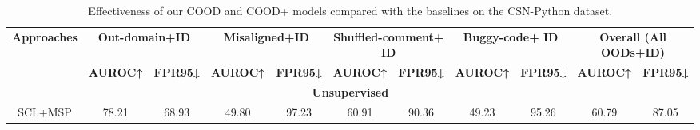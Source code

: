 
\begin{table*}[thb]
\centering
\footnotesize
\caption{Effectiveness of our COOD and COOD+ models compared with the baselines on the CSN-Python dataset.}
\label{tab:results-python}
\begin{adjustbox}{width=0.9\textwidth}\small
\begin{tabular}{|ccccccccccc|}
\hline
\multicolumn{1}{|c|}{\multirow{2}{*}{\textbf{Approaches}}} & \multicolumn{2}{c|}{\textbf{Out-domain+ID}}                                 & \multicolumn{2}{c|}{\textbf{Misaligned+ID}}                                 & \multicolumn{2}{c|}{\textbf{Shuffled-comment+ ID}}                          & \multicolumn{2}{c|}{\textbf{Buggy-code+ ID}}                                & \multicolumn{2}{c|}{\textbf{Overall (All OODs+ID)}}    \\ \cline{2-11} 
\multicolumn{1}{|c|}{}                            & \multicolumn{1}{c|}{\textbf{AUROC↑}} & \multicolumn{1}{c|}{\textbf{FPR95↓}} & \multicolumn{1}{c|}{\textbf{AUROC↑}} & \multicolumn{1}{c|}{\textbf{FPR95↓}} & \multicolumn{1}{c|}{\textbf{AUROC↑}} & \multicolumn{1}{c|}{\textbf{FPR95↓}} & \multicolumn{1}{c|}{\textbf{AUROC↑}} & \multicolumn{1}{c|}{\textbf{FPR95↓}} & \multicolumn{1}{c|}{\textbf{AUROC↑}} & \textbf{FPR95↓} \\ \hline
\multicolumn{11}{|c|}{\textbf{Unsupervised}}                                                                                                                                                                                                                                                                                                                                                                                \\ \hline
\multicolumn{1}{|c|}{SCL+MSP}              & \multicolumn{1}{c|}{78.21}           & \multicolumn{1}{c|}{68.93}           & \multicolumn{1}{c|}{49.80}           & \multicolumn{1}{c|}{97.23}           & \multicolumn{1}{c|}{60.91}           & \multicolumn{1}{c|}{90.36}           & \multicolumn{1}{c|}{49.23}           & \multicolumn{1}{c|}{95.26}           & \multicolumn{1}{c|}{60.79}           & 87.05           \\ \hline

\end{tabular}
\end{adjustbox}
\end{table*}
